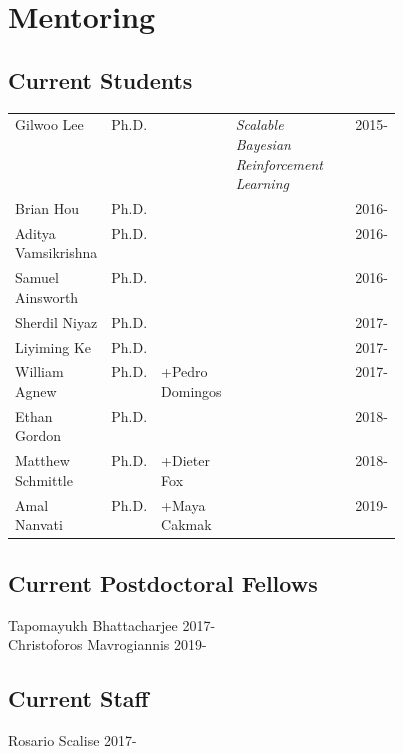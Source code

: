 

\section{Mentoring} 
\subsection{Current Students}
\vspace{-1em}
\begin{center}
\begin{tabular}{lrlp{0.45\linewidth}l}
Gilwoo Lee & Ph.D. &  & \textit{Scalable Bayesian Reinforcement Learning} & 2015-\\
Brian Hou & Ph.D. & & & 2016-\\
Aditya Vamsikrishna & Ph.D. & & & 2016-\\
Samuel Ainsworth & Ph.D. & & & 2016-\\
Sherdil Niyaz & Ph.D. & & & 2017-\\
Liyiming Ke & Ph.D. & & & 2017-\\
William Agnew & Ph.D. & +Pedro Domingos & & 2017-\\
Ethan Gordon & Ph.D. &  & & 2018-\\
Matthew Schmittle & Ph.D. & +Dieter Fox & & 2018-\\
Amal Nanvati & Ph.D. & +Maya Cakmak & & 2019-\\
\end{tabular}
\end{center}

\subsection{Current Postdoctoral Fellows}
\vspace{-1em}
\noindent
Tapomayukh Bhattacharjee \hfill 2017-\\
Christoforos Mavrogiannis \hfill 2019-\\

\subsection{Current Staff}
\vspace{-1em}
\noindent
Rosario Scalise \hfill 2017-\\

